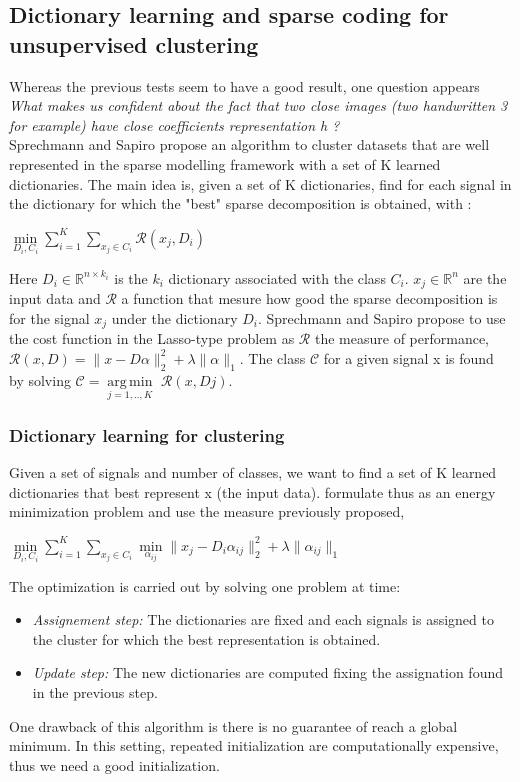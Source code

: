 \documentclass[a4paper,10pt]{article}
\newcommand{\R}{\mathbb{R}}
\DeclareMathOperator*{\argmin}{arg\,min}
\begin{document}
\subsection{Dictionary learning and sparse coding for unsupervised clustering}
\label{sec:Clustering}
Whereas the previous tests seem to have a good result, one question appears \\ \textit{What makes us confident about the fact that two close images (two handwritten 3 for example) have close coefficients representation h ?}\\
Sprechmann and Sapiro \cite{5494985} propose an algorithm to cluster datasets that are well represented in the sparse modelling framework with a set of K learned dictionaries. The main idea is, given a set of K dictionaries, find for each signal in the dictionary for which the "best" sparse decomposition is obtained, with :

\begin{center}
$\underset{D_i,C_i}{\min} \sum_{i=1}^{K} \sum_{x_j \in C_i} \mathcal{R}(x_j, D_i)$
 
\end{center}
Here $D_i \in \R^{n \times k_i}$ is the $k_i$ dictionary associated with the class $C_i$. $x_j \in \R^n$ are the input data and $\mathcal{R}$  a function that mesure how good the sparse decomposition is for the signal $x_j$ under the dictionary $D_i$. Sprechmann and Sapiro propose to use the cost function in the Lasso-type problem as $\mathcal{R}$ the measure of performance, $\mathcal{R}(x,D) = \|x - D\alpha\|^2_2 + \lambda \|\alpha\|_1$. The class $\mathcal{C}$ for a given signal x is found by solving $\mathcal{C}= \underset{j=1,..,K}{\argmin}$ $ \mathcal{R}(x,Dj) $.

\subsubsection{Dictionary learning for clustering}
Given a set of signals and number of classes, we want to find a set of K learned dictionaries that best represent x (the input data). \cite{5494985} formulate thus as an energy minimization problem and use the measure previously proposed,\\
\begin{center}
 $\underset{D_i,C_i}{\min} \sum_{i=1}^{K} \sum_{x_j \in C_i} \underset{\alpha_{ij}}{\min}\|x_j - D_i \alpha_{ij}\|^2_2 + \lambda\|\alpha_{ij}\|_1$
\end{center}
The optimization is carried out by solving one problem at time:
\begin{itemize}
 \item \textit{Assignement step:} The dictionaries are fixed and each signals is assigned to the cluster for which the best representation is obtained.
 \item \textit{Update step:} The new dictionaries are computed fixing the assignation found in the previous step.
\end{itemize}
One drawback of this algorithm is there is no guarantee of reach a global minimum. In this setting, repeated initialization are computationally expensive, thus we need a good initialization.
\end{document}

